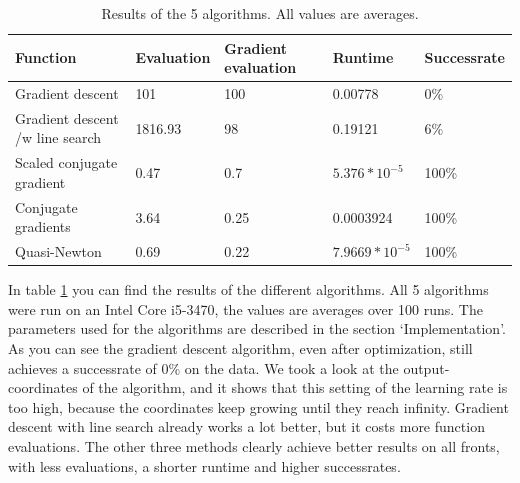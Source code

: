 \documentclass{article}
\begin{document}
\begin{table}[H]
	\centering
	\begin{tabular}{| l | l | l | l | l |}
		\hline
		Function                        & Evaluation  & Gradient evaluation & Runtime & Successrate \\ \hline
		Gradient descent                & 101         & 100  & 0.00778          & 0\% \\ \hline
		Gradient descent /w line search & 1816.93     & 98   & 0.19121          & 6\% \\ \hline
		Scaled conjugate gradient       & 0.47        & 0.7  & $5.376*10^{-5}$  & 100\% \\ \hline
		Conjugate gradients             & 3.64        & 0.25 & 0.0003924        & 100\% \\ \hline
		Quasi-Newton                    & 0.69        & 0.22 & $7.9669*10^{-5}$  & 100\% \\ \hline
	\end{tabular}
	\caption{Results of the 5 algorithms. All values are averages.}
	\label{table:results}
\end{table}

In table \ref{table:results} you can find the results of the different algorithms. All 5 algorithms were run on an Intel Core i5-3470, the values are averages over 100 runs. The parameters used for the algorithms are described in the section `Implementation'. As you can see the gradient descent algorithm, even after optimization, still achieves a successrate of 0\% on the data. We took a look at the output-coordinates of the algorithm, and it shows that this setting of the learning rate is too high, because the coordinates keep growing until they reach infinity. Gradient descent with line search already works a lot better, but it costs more function evaluations. The other three methods clearly achieve better results on all fronts, with less evaluations, a shorter runtime and higher successrates.
\end{document}
